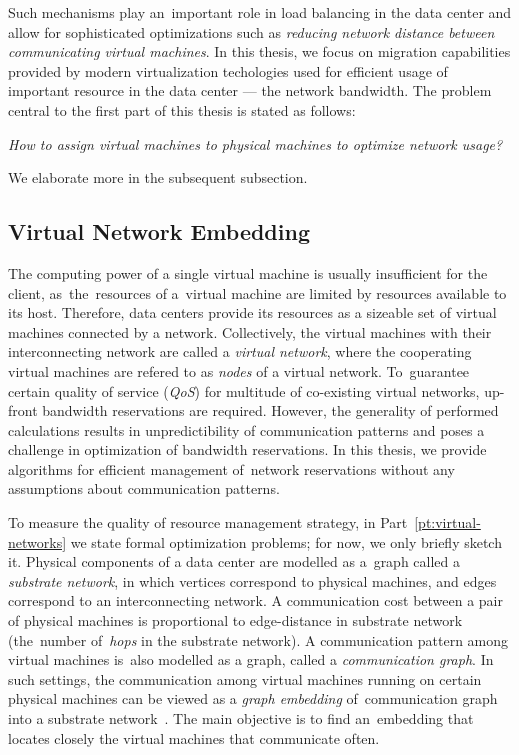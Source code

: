 Such mechanisms play an~important role in load balancing in the data center and allow for sophisticated optimizations such as \emph{reducing network distance between communicating virtual machines}.
In this thesis, we focus on migration capabilities provided by modern virtualization techologies used for efficient usage of important resource in the data center --- the network bandwidth.
The problem central to the first part of this thesis is stated as follows:

\begin{center}
  \emph{How to assign virtual machines to physical machines to optimize network
  usage?}
\end{center}
We elaborate more in the subsequent subsection.

\subsection{Virtual Network Embedding}
\label{sec:virt_net_emb}

The computing power of a single virtual machine is usually insufficient for the client, as~the~resources of a~virtual machine are limited by resources available to its host.
Therefore, data centers provide its resources as a sizeable set of virtual machines connected by a network.
Collectively, the virtual machines with their interconnecting network are called a \emph{virtual network}, where the cooperating virtual machines are refered to as \emph{nodes} of a virtual network.
To~guarantee certain quality of service (\emph{QoS}) for multitude of co-existing virtual networks, up-front bandwidth reservations are required.
However, the generality of performed calculations results in unpredictibility of communication patterns and poses a challenge in optimization of bandwidth reservations.
In this thesis, we provide algorithms for efficient management of~network reservations without any assumptions about communication patterns.

To measure the quality of resource management strategy, in Part~\ref{pt:virtual-networks} we state formal optimization problems; for now, we only briefly sketch it.
Physical components of a data center are modelled as a~graph called a \emph{substrate network}, in which vertices correspond to physical machines, and edges correspond to an interconnecting network.
A communication cost between a pair of physical machines is proportional to edge-distance in substrate network (the~number of~\emph{hops} in the substrate network).
A communication pattern among virtual machines is~also modelled as a graph, called a \emph{communication graph}.
In such settings, the communication among virtual machines running on certain physical machines can be viewed as a \emph{graph embedding} of~communication graph into a substrate network~\cite{gupta2001provisioning}.
The main objective is to find an~embedding that locates closely the virtual machines that communicate often.

